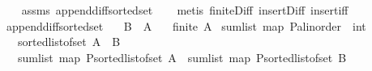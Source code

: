 \begin{isabellebody}
%
\isadelimproof
\ \ %
\endisadelimproof
%
\isatagproof
{}\isamarkupfalse%
\ assms\ append{\isacharunderscore}{\kern0pt}diff{\isacharunderscore}{\kern0pt}sorted{\isacharunderscore}{\kern0pt}set\isanewline
\ \ \isamarkupfalse%
\ {\isacharparenleft}{\kern0pt}metis\ finite{\isacharunderscore}{\kern0pt}Diff\ insert{\isacharunderscore}{\kern0pt}Diff\ insert{\isacharunderscore}{\kern0pt}iff{\isacharparenright}{\kern0pt}%
\endisatagproof
{\isafoldproof}%
%
\isadelimproof
\ \isanewline
%
\endisadelimproof
\isanewline
{}\isamarkupfalse%
\ append{\isacharunderscore}{\kern0pt}diff{\isacharunderscore}{\kern0pt}sorted{\isacharunderscore}{\kern0pt}set{}{\isacharcolon}{\kern0pt}\isanewline
\ \ \ {\isachardoublequoteopen}B\ {\isasymsubseteq}\ A{\isachardoublequoteclose}\isanewline
\ \ \ {\isachardoublequoteopen}finite\ A{\isachardoublequoteclose}\isanewline
{}\ {\isachardoublequoteopen}sum{\isacharunderscore}{\kern0pt}list\ {\isacharparenleft}{\kern0pt}{\isacharparenleft}{\kern0pt}map\ {\isacharparenleft}{\kern0pt}P{\isacharcolon}{\kern0pt}{\isacharcolon}{\kern0pt}{\isacharparenleft}{\kern0pt}{\isacharprime}{\kern0pt}a{\isacharcolon}{\kern0pt}{\isacharcolon}{\kern0pt}linorder\ {\isasymRightarrow}\ int{\isacharparenright}{\kern0pt}{\isacharparenright}{\kern0pt}{\isacharparenright}{\kern0pt}\isanewline
\ \ \ {\isacharparenleft}{\kern0pt}sorted{\isacharunderscore}{\kern0pt}list{\isacharunderscore}{\kern0pt}of{\isacharunderscore}{\kern0pt}set\ {\isacharparenleft}{\kern0pt}A\ {\isacharminus}{\kern0pt}\ B{\isacharparenright}{\kern0pt}{\isacharparenright}{\kern0pt}{\isacharparenright}{\kern0pt}\ \isanewline
\ \ {\isacharequal}{\kern0pt}\ sum{\isacharunderscore}{\kern0pt}list\ {\isacharparenleft}{\kern0pt}{\isacharparenleft}{\kern0pt}map\ P{\isacharparenright}{\kern0pt}{\isacharparenleft}{\kern0pt}sorted{\isacharunderscore}{\kern0pt}list{\isacharunderscore}{\kern0pt}of{\isacharunderscore}{\kern0pt}set\ {\isacharparenleft}{\kern0pt}A{\isacharparenright}{\kern0pt}{\isacharparenright}{\kern0pt}{\isacharparenright}{\kern0pt}\ {\isacharminus}{\kern0pt}\ sum{\isacharunderscore}{\kern0pt}list\ {\isacharparenleft}{\kern0pt}{\isacharparenleft}{\kern0pt}map\ P{\isacharparenright}{\kern0pt}{\isacharparenleft}{\kern0pt}sorted{\isacharunderscore}{\kern0pt}list{\isacharunderscore}{\kern0pt}of{\isacharunderscore}{\kern0pt}set\ {\isacharparenleft}{\kern0pt}B{\isacharparenright}{\kern0pt}{\isacharparenright}{\kern0pt}{\isacharparenright}{\kern0pt}{\isachardoublequoteclose}\isanewline
%

\end{isabellebody}
